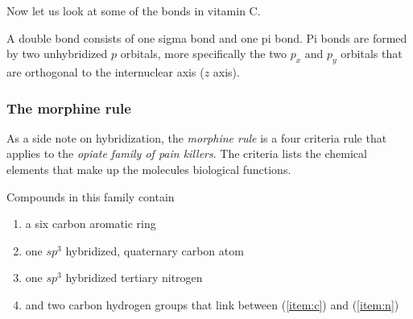 \documentclass[../mit-general-chemistry.tex]{subfiles}
\begin{document}
Now let us look at some of the bonds in vitamin C.


\begin{center}
\end{center}
\vspace{4\parskip}



\begin{remark}
  A double bond consists of one sigma bond and one pi bond. Pi bonds
  are formed by two unhybridized $p$ orbitals, more specifically the
  two $p_x$ and $p_y$ orbitals that are orthogonal to the internuclear
  axis ($z$ axis).
\end{remark}





\subsubsection{The morphine rule}

As a side note on hybridization, the {\em morphine rule} is a four
criteria rule that applies to the {\em opiate family of pain
  killers}. The criteria lists the chemical elements that make up the
molecules biological functions.

Compounds in this family contain
\begin{enumerate}
\item a six carbon aromatic ring
\item one $sp^3$ hybridized, quaternary carbon atom \label{item:c}
\item one $sp^3$ hybridized tertiary nitrogen \label{item:n}
\item and two carbon hydrogen groups that link between (\ref{item:c})
  and (\ref{item:n})
\end{enumerate}
\end{document}
